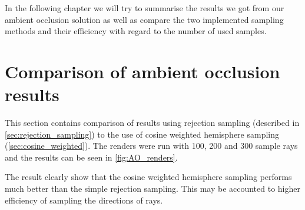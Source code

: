 In the following chapter we will try to summarise the results we got from our ambient occlusion solution as well as compare the two implemented sampling methods and their efficiency with regard to the number of used samples.

\section{Comparison of ambient occlusion results}
This section contains comparison of results using rejection sampling (described in \autoref{sec:rejection_sampling}) to the use of cosine weighted hemisphere sampling (\autoref{sec:cosine_weighted}). The renders were run with 100, 200 and 300 sample rays and the results can be seen in \autoref{fig:AO_renders}.
\newline

The result clearly show that the cosine weighted hemisphere sampling performs much better than the simple rejection sampling. This may be accounted to higher efficiency of sampling the directions of rays.

